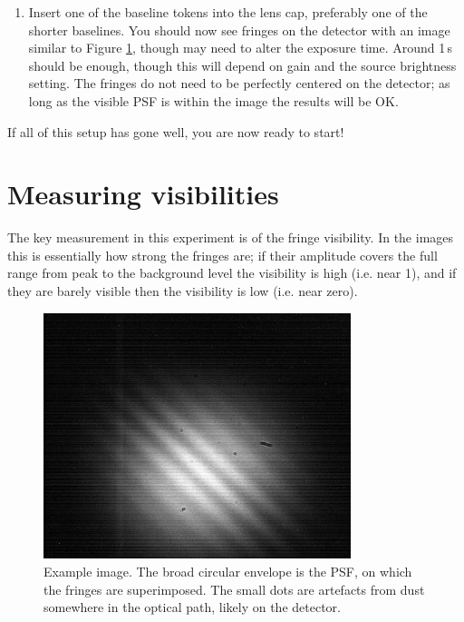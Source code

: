 \documentclass[11pt]{article}
\begin{document}
\begin{enumerate}
    \item Insert one of the baseline tokens into the lens cap, preferably one of the shorter baselines. You should now see fringes on the detector with an image similar to Figure \ref{fig:det-img}, though may need to alter the exposure time. Around 1\,s should be enough, though this will depend on gain and the source brightness setting. The fringes do not need to be perfectly centered on the detector; as long as the visible PSF is within the image the results will be OK.
\end{enumerate}

If all of this setup has gone well, you are now ready to start!

\clearpage
\section{Measuring visibilities}\label{sec:meas}

The key measurement in this experiment is of the fringe visibility. In the images this is essentially how strong the fringes are; if their amplitude covers the full range from peak to the background level the visibility is high (i.e. near 1), and if they are barely visible then the visibility is low (i.e. near zero).

\begin{figure}[h]
    \centering
    \includegraphics[width=0.8\textwidth]{doc/det-img.png}
    \caption{Example image. The broad circular envelope is the PSF, on which the fringes are superimposed. The small dots are artefacts from dust somewhere in the optical path, likely on the detector.}
    \label{fig:det-img}
\end{figure}
\end{document}

